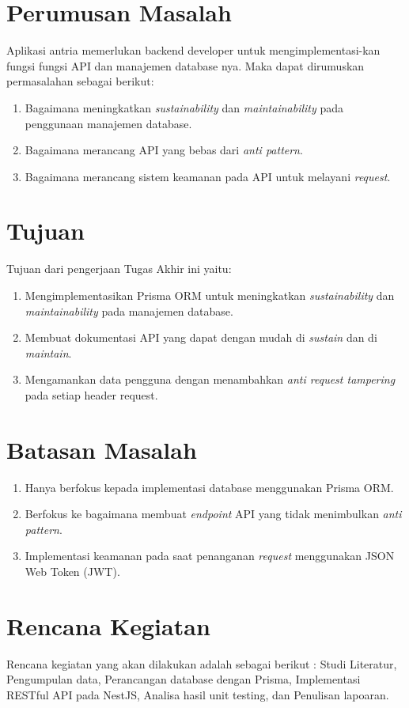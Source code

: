 \section{Perumusan Masalah}
Aplikasi antria memerlukan backend developer untuk mengimplementasi-kan fungsi fungsi API dan manajemen database nya. Maka dapat dirumuskan permasalahan sebagai berikut:
\begin{enumerate}
  \item Bagaimana meningkatkan \textit{sustainability} dan \textit{maintainability} pada penggunaan manajemen database.
  \item Bagaimana merancang API yang bebas dari \textit{anti pattern}.
  \item Bagaimana merancang sistem keamanan pada API untuk melayani \textit{request}.
\end{enumerate}


\section{Tujuan}
Tujuan dari pengerjaan Tugas Akhir ini yaitu:
\begin{enumerate}
  \item Mengimplementasikan Prisma ORM untuk meningkatkan \textit{sustainability} dan \textit{maintainability} pada manajemen database.
  \item Membuat dokumentasi API yang dapat dengan mudah di \textit{sustain} dan di \textit{maintain}.
  \item Mengamankan data pengguna dengan menambahkan \textit{anti request tampering} pada setiap header request.
  
\end{enumerate}

\section{Batasan Masalah}
\begin{enumerate}
  \item Hanya berfokus kepada implementasi database menggunakan Prisma ORM.
  \item Berfokus ke bagaimana membuat \textit{endpoint} API yang tidak menimbulkan \textit{anti pattern}.
  \item Implementasi keamanan pada saat penanganan \textit{request} menggunakan JSON Web Token (JWT).
\end{enumerate}

\section{Rencana Kegiatan}
Rencana kegiatan yang akan dilakukan adalah sebagai berikut : Studi Literatur, Pengumpulan data, Perancangan database dengan Prisma, Implementasi RESTful API pada NestJS, Analisa hasil unit testing, dan Penulisan lapoaran.
\newpage
